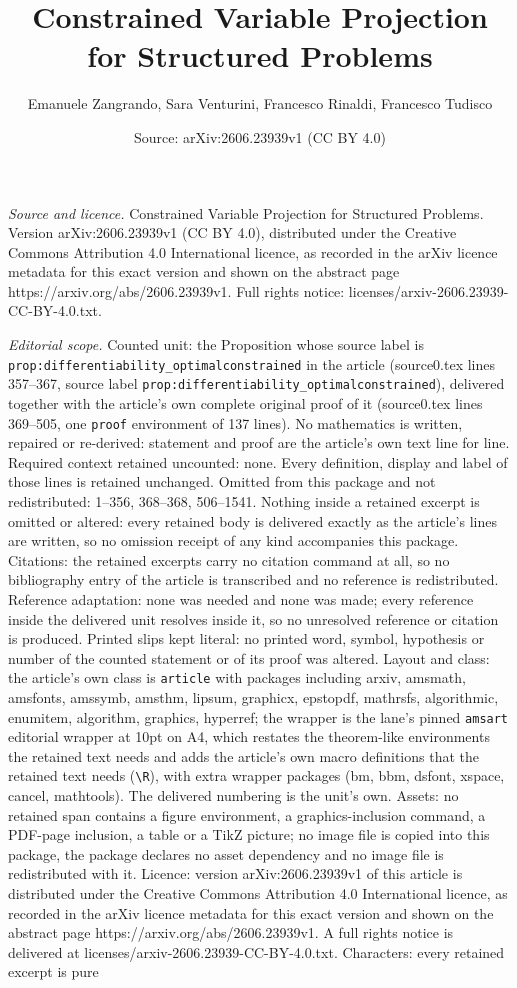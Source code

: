 \documentclass[10pt,a4paper]{amsart}
\title[Constrained Variable Projection for Structured Problems]{Constrained Variable Projection for Structured Problems}
\author{Emanuele Zangrando, Sara Venturini, Francesco Rinaldi, Francesco Tudisco}
\date{Source: arXiv:2606.23939v1 (CC BY 4.0)}
\begin{document}
\maketitle

\noindent\emph{Source and licence.} Constrained Variable Projection for Structured Problems. Version arXiv:2606.23939v1 (CC BY 4.0), distributed under the Creative Commons Attribution 4.0 International licence, as recorded in the arXiv licence metadata for this exact version and shown on the abstract page https://arxiv.org/abs/2606.23939v1. Full rights notice: licenses/arxiv-2606.23939-CC-BY-4.0.txt.\par\smallskip

\noindent\textit{Editorial scope.} Counted unit: the Proposition whose source label is \texttt{prop:differentiability\_optimalconstrained} in the article (source0.tex lines 357--367, source label \texttt{prop:differentiability\_optimalconstrained}), delivered together with the article's own complete original proof of it (source0.tex lines 369--505, one \texttt{proof} environment of 137 lines). No mathematics is written, repaired or re-derived: statement and proof are the article's own text line for line. Required context retained uncounted: none. Every definition, display and label of those lines is retained unchanged. Omitted from this package and not redistributed: 1--356, 368--368, 506--1541. Nothing inside a retained excerpt is omitted or altered: every retained body is delivered exactly as the article's lines are written, so no omission receipt of any kind accompanies this package. Citations: the retained excerpts carry no citation command at all, so no bibliography entry of the article is transcribed and no reference is redistributed. Reference adaptation: none was needed and none was made; every reference inside the delivered unit resolves inside it, so no unresolved reference or citation is produced. Printed slips kept literal: no printed word, symbol, hypothesis or number of the counted statement or of its proof was altered. Layout and class: the article's own class is \texttt{article} with packages including arxiv, amsmath, amsfonts, amssymb, amsthm, lipsum, graphicx, epstopdf, mathrsfs, algorithmic, enumitem, algorithm, graphics, hyperref; the wrapper is the lane's pinned \texttt{amsart} editorial wrapper at 10pt on A4, which restates the theorem-like environments the retained text needs and adds the article's own macro definitions that the retained text needs (\texttt{\textbackslash R}), with extra wrapper packages (bm, bbm, dsfont, xspace, cancel, mathtools). The delivered numbering is the unit's own. Assets: no retained span contains a figure environment, a graphics-inclusion command, a PDF-page inclusion, a table or a TikZ picture; no image file is copied into this package, the package declares no asset dependency and no image file is redistributed with it. Licence: version arXiv:2606.23939v1 of this article is distributed under the Creative Commons Attribution 4.0 International licence, as recorded in the arXiv licence metadata for this exact version and shown on the abstract page https://arxiv.org/abs/2606.23939v1. A full rights notice is delivered at licenses/arxiv-2606.23939-CC-BY-4.0.txt. Characters: every retained excerpt is pure 
\end{document}
